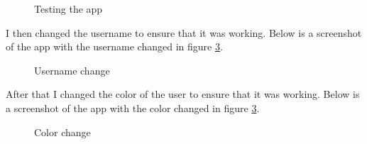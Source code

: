 \documentclass[12pt]{Article}
\begin{document}
\begin{figure}[H]
    \centering
    \caption{Testing the app}
    \label{fig:app}
\end{figure}

I then changed the username to ensure that it was working.
Below is a screenshot of the app with the username changed in figure \ref{fig:app}.

\begin{figure}[H]
    \centering
    \caption{Username change}
    \label{fig:app}
\end{figure}

After that I changed the color of the user to ensure that it was working.
Below is a screenshot of the app with the color changed in figure \ref{fig:app}.

\begin{figure}[H]
    \centering
    \caption{Color change}
    \label{fig:app}
\end{figure}
\end{document}
